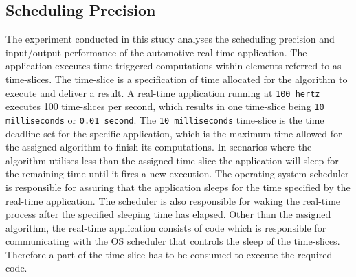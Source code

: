 \subsection{Scheduling Precision}
The experiment conducted in this study analyses the scheduling precision and input/output performance of the automotive real-time application. The application executes time-triggered computations within elements referred to as time-slices. The time-slice is a specification of time allocated for the algorithm to execute and deliver a result. A real-time application running at \texttt{100 hertz} executes 100 time-slices per second, which results in one time-slice being \texttt{10 milliseconds} or \texttt{0.01 second}. The \texttt{10 milliseconds} time-slice is the time deadline set for the specific application, which is the maximum time allowed for the assigned algorithm to finish its computations. In scenarios where the algorithm utilises less than the assigned time-slice the application will sleep for the remaining time until it fires a new execution. The operating system scheduler is responsible for assuring that the application sleeps for the time specified by the real-time application. The scheduler is also responsible for waking the real-time process after the specified sleeping time has elapsed. Other than the assigned algorithm, the real-time application consists of code which is responsible for communicating with the OS scheduler that controls the sleep of the time-slices. Therefore a part of the time-slice has to be consumed to execute the required code. 


